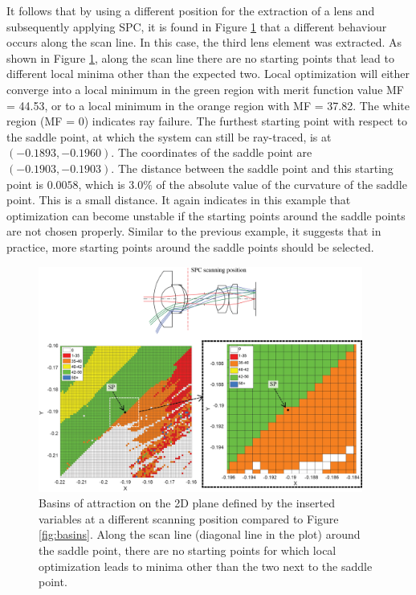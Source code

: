 It follows that by using a different position for the extraction of a lens and subsequently applying SPC, it is found in Figure \ref{fig:basins_WAL_M3_S5} that a different behaviour occurs along the scan line. In this case, the third lens element was extracted. As shown in Figure \ref{fig:basins_WAL_M3_S5}, along the scan line there are no starting points that lead to different local minima other than the expected two. Local optimization will either converge into a local minimum in the green region with merit function value MF = 44.53, or to a local minimum in the orange region with MF = 37.82. The white region (MF = 0) indicates ray failure. The furthest starting point with respect to the saddle point, at which the system can still be ray-traced, is at $(-0.1893, -0.1960)$. The coordinates of the saddle point are $(-0.1903, -0.1903)$. The distance between the saddle point and this starting point is $0.0058$, which is $3.0\%$ of the absolute value of the curvature of the saddle point. This is a small distance. It again indicates in this example that optimization can become unstable if the starting points around the saddle points are not chosen properly. Similar to the previous example, it suggests that in practice, more starting points around the saddle points should be selected. 
\begin{figure}[h!]
    \centering
    \includegraphics[width=0.95\textwidth]{chapter-4/figures/M3-S5_basins.png}
    \caption{Basins of attraction on the 2D plane defined by the inserted variables at a different scanning position compared to Figure \ref{fig:basins}. Along the scan line (diagonal line in the plot) around the saddle point, there are no starting points for which local optimization leads to minima other than the two next to the saddle point.}
    \label{fig:basins_WAL_M3_S5}
\end{figure}
